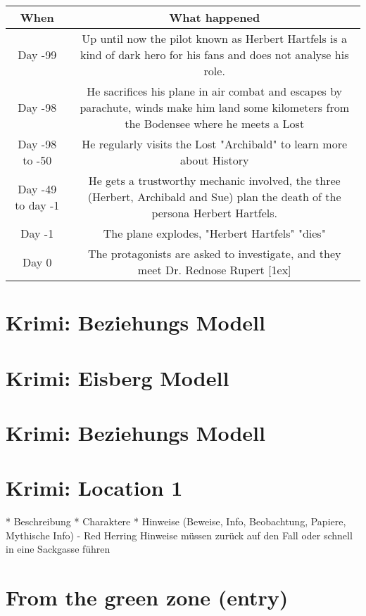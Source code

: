 \begin{center}
    \begin{tabular}{|c c|}
    \hline
     When & What happened \\ [0.5ex]
     \hline\hline
     Day -99 & Up until now the pilot known as Herbert Hartfels is a kind of dark hero for his fans and does not analyse his role. \\
     \hline
     Day -98 & He sacrifices his plane in air combat and escapes by parachute, winds make him land some kilometers from the Bodensee where he meets a Lost \\
     \hline
     Day -98 to -50 & He regularly visits the Lost "Archibald"  to learn more about History \\
     \hline
     Day -49 to day -1 & He gets a trustworthy mechanic involved, the three (Herbert, Archibald and Sue) plan the death of the persona Herbert Hartfels. \\
     \hline
     Day -1 & The plane explodes, "Herbert Hartfels" "dies" \\
     \hline
     Day 0 & The protagonists are asked to investigate, and they meet Dr. Rednose Rupert [1ex]
    \hline
    \end{tabular}
    \end{center}

\section{Krimi: Beziehungs Modell}

\section{Krimi: Eisberg Modell}

\section{Krimi: Beziehungs Modell}

\section{Krimi: Location 1}

* Beschreibung
* Charaktere
* Hinweise (Beweise, Info, Beobachtung, Papiere, Mythische Info) - Red Herring Hinweise müssen zurück auf den Fall oder schnell in eine Sackgasse führen


\section{From the green zone (entry)}

